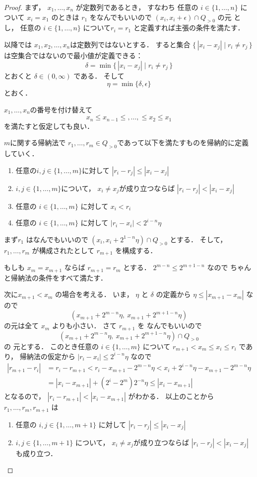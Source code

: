 \documentclass[leqno, 12pt]{jsarticle}
\begin{document}
\begin{proof}


まず，
$x_{1}, \dots, x_{n}$
が定数列であるとき，
すなわち
任意の
$i\in \{1, \dots, n\}$
について
$x_{i}=x_{1}$
のときは
$r_{1}$
をなんでもいいので
$(x_{i}, x_{i}+\epsilon)\cap Q_{>0}$
の元
とし，
任意の
$i\in \{1, \dots, n\}$
について$r_{i}=r_{1}$
と定義すれば主張の条件を満たす．

以降では
$x_{1}, x_{2}, \dots, x_{n}$は定数列ではないとする．
すると集合
$\{\, |x_{i}-x_{j}| \mid r_{i}\neq r_{j}\, \}$
は空集合ではないので最小値が定義できる：
\[
\delta=\min\{\, |x_{i}-x_{j}| \mid r_{i}\neq r_{j}\, \}
\]
とおくと
$\delta\in (0, \infty)$
である．
そして
\[
\eta=\min\{\delta, \epsilon \}
\]
とおく．


$x_{1}, \dots, x_{n}$の番号を付け替えて
\[
x_{n}\le x_{n-1}\le,  \dots, \le x_{2}\le x_{1}
\]
を満たすと仮定しても良い．

$m$に関する帰納法で
$r_{1}, \dots, r_{m}\in Q_{>0}$であって以下を満たすものを帰納的に定義していく．
\begin{enumerate}
\item 
任意の$i, j\in \{1, \dots, m\}$に対して
$|r_{i}-r_{j}|\le |x_{i}-x_{j}|$
\item 
$i, j\in \{1, \dots, m\}$について，
$x_i\neq x_j$が成り立つならば
$|r_{i}-r_{j}|<|x_{i}-x_{j}|$
\item 
任意の
$i\in \{1, \dots, m\}$
に対して
$  x_{i}<r_{i}$
\item 
任意の
$i\in \{1, \dots, m\}$
に対して
$|r_{i}-x_{i}|<2^{i-n}\eta$
\end{enumerate}


まず$r_{1}$
はなんでもいいので
$(x_{i}, x_{i}+2^{1-n}\eta)\cap Q_{>0}$
とする．
そして，
$r_{1}, \dots, r_{m}$
が構成されたとして
$r_{m+1}$
を構成する．



もしも
$x_{m}=x_{m+1}$
ならば
$r_{m+1}=r_{m}$
とする．
$2^{m-n}\le 2^{m+1-n}$
なので
ちゃんと帰納法の条件をすべて満たす．

次に$x_{m+1}<x_{m}$
の場合を考える．
いま，
$\eta$
と
$\delta$
の定義から
$\eta\le|x_{m+1}-x_{m}|$
なので
\[
(x_{m+1}+2^{m-n}\eta, \  x_{m+1}+2^{m+1-n}\eta)
\]
の元は全て
$x_{m}$
よりも小さい．
さて
$r_{m+1}$
を
なんでもいいので
\[
(x_{m+1}+2^{m-n}\eta, \  x_{m+1}+2^{m+1-n}\eta)\cap Q_{>0}
\]
の
元とする．
このとき任意の
$i\in \{1, \dots, m\}$
について
$r_{m+1}<x_{m}\le x_{i}\le r_{i}$
であり，
帰納法の仮定から
$|r_{i}-x_{i}|\le 2^{i-n}\eta$
なので
\begin{align*}
|r_{m+1}-r_{i}|
&=
r_{i}-r_{m+1}
< r_{i} - x_{m+1}-2^{m-n}\eta
< x_{i}+2^{i-n}\eta-x_{m+1}-2^{m-n}\eta\\
&=|x_{i}-x_{m+1}|+(2^i-2^{m})2^{-n}\eta
\le |x_{i}-x_{m+1}|
\end{align*}
となるので，
$|r_{i}-r_{m+1}|<|x_{i}-x_{m+1}|$
がわかる．
以上のことから
$r_{1}, \dots, r_{m}, r_{m+1}$
は
\begin{enumerate}
\item 
任意の
$i, j\in \{1, \dots, m+1\}$
に対して
$|r_{i}-r_{j}|\le |x_{i}-x_{j}|$
\item 
$i, j\in \{1, \dots, m+1\}$
について，
$x_{i}\neq x_{j}$が成り立つならば
$|r_{i}-r_{j}|<|x_{i}-x_{j}|$
も成り立つ．


\end{enumerate}
\end{proof}
\end{document}
